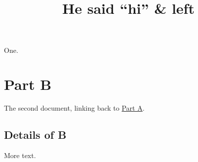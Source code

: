 \documentclass[
]{article}
\title{He said ``hi'' \& left}
\author{}
\date{}
\begin{document}
\maketitle

One.

\newpage

\section{Part B}\label{part-b}

The second document, linking back to \hyperref[part-a]{Part A}.

\subsection{Details of B}\label{details-of-b}

More text.
\end{document}
